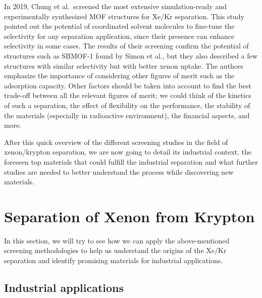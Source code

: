 \documentclass[main.tex]{subfiles}
\begin{document}
In 2019, Chung et al.\ screened the most extensive simulation-ready and experimentally synthesized MOF structures for Xe/Kr separation.\autocite{Chung_2019} This study pointed out the potential of coordinated solvent molecules to fine-tune the selectivity for any separation application, since their presence can enhance selectivity in some cases. The results of their screening confirm the potential of structures such as SBMOF-1 found by Simon et al., but they also described a few structures with similar selectivity but with better xenon uptake. The authors emphasize the importance of considering other figures of merit such as the adsorption capacity. Other factors should be taken into account to find the best trade-off between all the relevant figures of merit; we could think of the kinetics of such a separation, the effect of flexibility on the performance, the stability of the materials (especially in radioactive environment), the financial aspects, and more.

After this quick overview of the different screening studies in the field of xenon/krypton separation, we are now going to detail its industrial context, the foreseen top materials that could fulfill the industrial separation and what further studies are needed to better understand the process while discovering new materials.


\section{Separation of Xenon from Krypton}

In this section, we will try to see how we can apply the above-mentioned screening methodologies to help us understand the origins of the Xe/Kr separation and identify promising materials for industrial applications. 

\subsection{Industrial applications}\label{sct:industrial}
\end{document}

